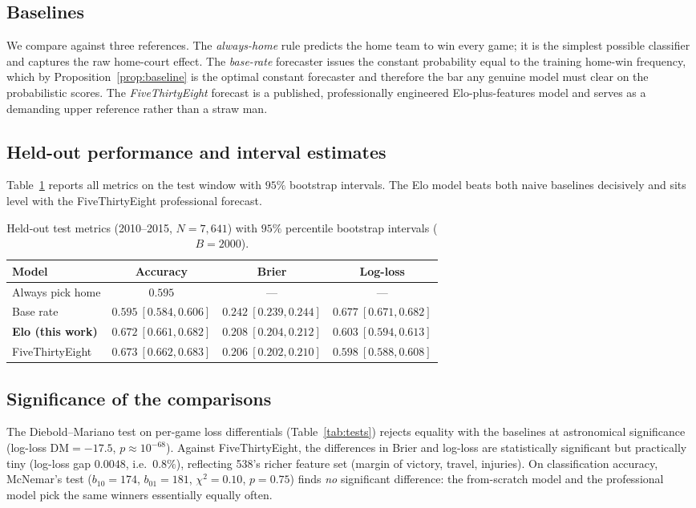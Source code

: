 \documentclass[11pt]{article}
\begin{document}
\subsection{Baselines}
We compare against three references. The \emph{always-home} rule predicts the home
team to win every game; it is the simplest possible classifier and captures the raw
home-court effect. The \emph{base-rate} forecaster issues the constant probability
equal to the training home-win frequency, which by Proposition~\ref{prop:baseline}
is the optimal constant forecaster and therefore the bar any genuine model must
clear on the probabilistic scores. The \emph{FiveThirtyEight} forecast is a
published, professionally engineered Elo-plus-features model and serves as a
demanding upper reference rather than a straw man.

\subsection{Held-out performance and interval estimates}
Table~\ref{tab:main} reports all metrics on the test window with $95\%$ bootstrap
intervals. The Elo model beats both naive baselines decisively and sits level
with the FiveThirtyEight professional forecast.

\begin{table}[h]
\centering
\begin{tabular}{lccc}
\toprule
Model & Accuracy & Brier & Log-loss \\
\midrule
Always pick home & $0.595$ & --- & --- \\
Base rate & $0.595\ [0.584,0.606]$ & $0.242\ [0.239,0.244]$ & $0.677\ [0.671,0.682]$ \\
\textbf{Elo (this work)} & $\mathbf{0.672\ [0.661,0.682]}$ & $\mathbf{0.208\ [0.204,0.212]}$ & $\mathbf{0.603\ [0.594,0.613]}$ \\
FiveThirtyEight & $0.673\ [0.662,0.683]$ & $0.206\ [0.202,0.210]$ & $0.598\ [0.588,0.608]$ \\
\bottomrule
\end{tabular}
\caption{Held-out test metrics (2010--2015, $N=7{,}641$) with $95\%$ percentile
bootstrap intervals ($B=2000$).}
\label{tab:main}
\end{table}

\subsection{Significance of the comparisons}
The Diebold--Mariano test on per-game loss differentials
(Table~\ref{tab:tests}) rejects equality with the baselines at astronomical
significance (log-loss $\mathrm{DM}=-17.5$, $p\approx 10^{-68}$). Against
FiveThirtyEight, the differences in Brier and log-loss are statistically
significant but practically tiny (log-loss gap $0.0048$, i.e.\ $0.8\%$),
reflecting 538's richer feature set (margin of victory, travel, injuries). On
classification accuracy, McNemar's test ($b_{10}=174$, $b_{01}=181$,
$\chi^2=0.10$, $p=0.75$) finds \emph{no} significant difference: the from-scratch
model and the professional model pick the same winners essentially equally often.
\end{document}

